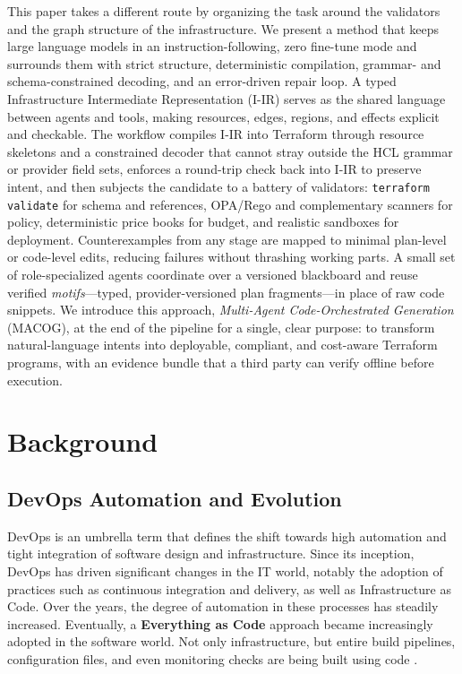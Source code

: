 \documentclass[acmsmall,screen,review,anonymous]{acmart}
\begin{document}
This paper takes a different route by organizing the task around the validators and the graph structure of the infrastructure. We present a method that keeps large language models in an instruction-following, zero fine-tune mode and surrounds them with strict structure, deterministic compilation, grammar- and schema-constrained decoding, and an error-driven repair loop. A typed Infrastructure Intermediate Representation (I-IR) serves as the shared language between agents and tools, making resources, edges, regions, and effects explicit and checkable. The workflow compiles I-IR into Terraform through resource skeletons and a constrained decoder that cannot stray outside the HCL grammar \cite{riti2021beginning} or provider field sets, enforces a round-trip check back into I-IR to preserve intent, and then subjects the candidate to a battery of validators: \texttt{terraform validate} for schema and references, OPA/Rego and complementary scanners for policy, deterministic price books for budget, and realistic sandboxes for deployment. Counterexamples from any stage are mapped to minimal plan-level or code-level edits, reducing failures without thrashing working parts. A small set of role-specialized agents coordinate over a versioned blackboard and reuse verified \emph{motifs}—typed, provider-versioned plan fragments—in place of raw code snippets. We introduce this approach, \emph{Multi-Agent Code-Orchestrated Generation} (MACOG), at the end of the pipeline for a single, clear purpose: to transform natural-language intents into deployable, compliant, and cost-aware Terraform programs, with an evidence bundle that a third party can verify offline before execution.

\section{Background}

\subsection{DevOps Automation and Evolution}
DevOps is an umbrella term that defines the shift towards high automation and tight integration of software design and infrastructure. Since its inception, DevOps has driven significant changes in the IT world, notably the adoption of practices such as continuous integration and delivery, as well as Infrastructure as Code. Over the years, the degree of automation in these processes has steadily increased. Eventually, a \textbf{Everything as Code} approach became increasingly adopted in the software world. Not only infrastructure, but entire build pipelines, configuration files, and even monitoring checks are being built using code \cite{vakhula2025research}. 
\end{document}
